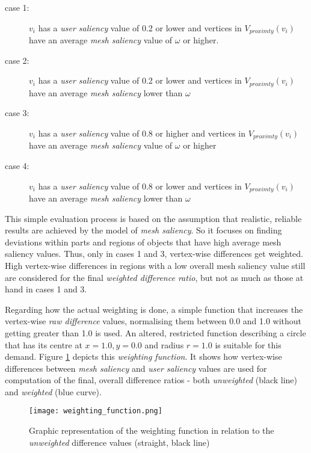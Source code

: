 \begin{description}
	\item [case 1:] $v_i$ has a \textit{user saliency} value of 0.2 or lower and vertices in $V_{proximty}(v_i)$ have an average \textit{mesh saliency} value of $\omega$ or higher.
	\item [case 2:] $v_i$ has a \textit{user saliency} value of 0.2 or lower and vertices in $V_{proximty}(v_i)$ have an average \textit{mesh saliency} lower than $\omega$
	\item [case 3:] $v_i$ has a \textit{user saliency} value of 0.8 or higher and vertices in $V_{proximty}(v_i)$ have an average \textit{mesh saliency} value of $\omega$ or higher
	\item [case 4:] $v_i$ has a \textit{user saliency} value of 0.8 or lower and vertices in $V_{proximty}(v_i)$ have an average \textit{mesh saliency} lower than $\omega$
\end{description}

This simple evaluation process is based on the assumption that realistic, reliable results are achieved by the model of \textit{mesh saliency}. So it focuses on finding deviations within parts and regions of objects that have high average mesh saliency values. Thus, only in cases 1 and 3, vertex-wise differences get weighted. High vertex-wise differences in regions with a low overall mesh saliency value still are considered for the final \textit{weighted difference ratio}, but not as much as those at hand in cases 1 and 3.

Regarding how the actual weighting is done, a simple function that increases the vertex-wise \textit{raw difference} values, normalising them between 0.0 and 1.0 without getting greater than 1.0 is used. An altered, restricted function describing a circle that has its centre at $x = 1.0, y = 0.0$ and radius $r = 1.0$ is suitable for this demand. Figure \ref{fig:weighting_function} depicts this \textit{weighting function}. It shows how vertex-wise differences between \textit{mesh saliency} and \textit{user saliency} values are used for computation of the final, overall difference ratios - both \textit{unweighted} (black line) and \textit{weighted} (blue curve).

\begin{figure}[htb]
  \centering
  \texttt{[image: weighting\_function.png]}\\ %
  \caption{Graphic representation of the weighting function in relation to the \textit{unweighted} difference values (straight, black line)}\label{fig:weighting_function}
\end{figure}

